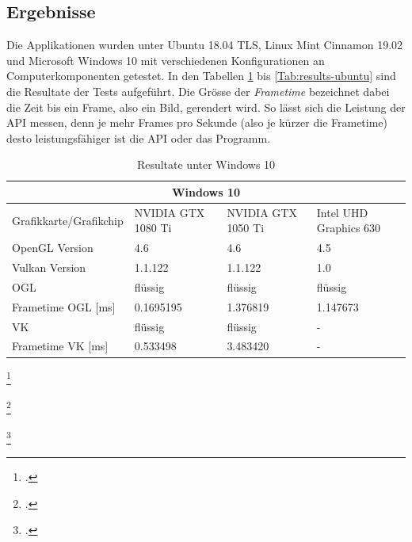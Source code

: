 \documentclass[titlepage, 11pt, a4paper, ngerman]{article}
\begin{document}
\subsection{Ergebnisse}
Die Applikationen wurden unter Ubuntu 18.04 TLS, \gls{Linux} Mint Cinnamon 19.02 und Microsoft Windows 10 mit verschiedenen Konfigurationen an Computerkomponenten getestet. In den Tabellen \ref{tab:results-win} bis \ref{Tab:results-ubuntu} sind die Resultate der Tests aufgeführt. Die Grösse der \textit{\gls{Frametime}} bezeichnet dabei die Zeit bis ein \gls{Frame}, also ein Bild, gerendert wird. So lässt sich die Leistung der \acrshort{API} messen, denn je mehr \glspl{Frame} pro Sekunde (also je kürzer die \gls{Frametime}) desto leistungsfähiger ist die \acrshort{API} oder das Programm.
\begin{table}[ht]
    \centering
    \caption[Resultate unter Windows 10]{Resultate unter Windows 10}
    \bigbreak
    \begin{tabular}{|p{4cm}||p{2.5cm}|p{2.5cm}|p{3cm}|}
    \hline
    \multicolumn{4}{|c|}{Windows 10} \\
    \hline
    Grafikkarte/Grafikchip & NVIDIA GTX 1080 Ti\footnotemark & NVIDIA GTX 1050 Ti\footnotemark & Intel UHD Graphics 630\footnotemark \\
    \acrshort{OpenGL} Version & 4.6 & 4.6 & 4.5 \\
    Vulkan Version & 1.1.122 & 1.1.122 & 1.0 \\
    \hline
    \hline
    OGL & flüssig & flüssig & flüssig \\
    \gls{Frametime} OGL [ms] & 0.1695195 & 1.376819 & 1.147673 \\
    VK & flüssig & flüssig & - \\
    \gls{Frametime} VK [ms] & 0.533498 & 3.483420 & - \\
    \hline
    \end{tabular}
    \label{tab:results-win}
\end{table}
\addtocounter{footnote}{-2}
\footcitetext{nv1080ti}
\addtocounter{footnote}{1}
\footcitetext{nv1050ti}
\addtocounter{footnote}{1}
\footcitetext{intel630}
\end{document}
